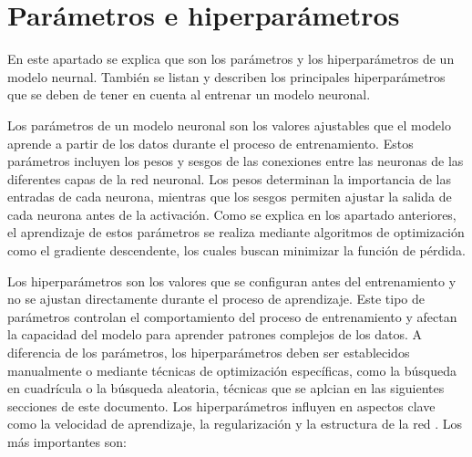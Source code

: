 \section{Parámetros e hiperparámetros}\label{sec:paramhiper}
En este apartado se explica que son los parámetros y los hiperparámetros de un modelo neurnal. También se listan y describen los principales hiperparámetros que se deben de tener en cuenta al entrenar un modelo neuronal. 

Los parámetros de un modelo neuronal son los valores ajustables que el modelo aprende a partir de los datos durante el proceso de entrenamiento. Estos parámetros incluyen los pesos y sesgos de las conexiones entre las neuronas de las diferentes capas de la red neuronal. Los pesos determinan la importancia de las entradas de cada neurona, mientras que los sesgos permiten ajustar la salida de cada neurona antes de la activación. Como se explica en los apartado anteriores, el aprendizaje de estos parámetros se realiza mediante algoritmos de optimización como el gradiente descendente, los cuales buscan minimizar la función de pérdida. \cite{goodfellow2016deep}


Los hiperparámetros son los valores que se configuran antes del entrenamiento y no se ajustan directamente durante el proceso de aprendizaje. Este tipo de parámetros controlan el comportamiento del proceso de entrenamiento y afectan la capacidad del modelo para aprender patrones complejos de los datos. A diferencia de los parámetros, los hiperparámetros deben ser establecidos manualmente o mediante técnicas de optimización específicas, como la búsqueda en cuadrícula o la búsqueda aleatoria, técnicas que se aplcian en las siguientes secciones de este documento. Los hiperparámetros influyen en aspectos clave como la velocidad de aprendizaje, la regularización y la estructura de la red \cite{chollet2018deep}. Los más importantes son:

